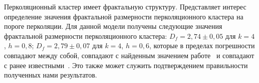 


%










Перколяционный кластер имеет фрактальную структуру. Представляет интерес определение значения фрактальной размерности перколяционного кластера на пороге перколяции. Для данной модели получены следующие значения фрактальной размерности перколяционного кластера: $D_{f}=2,74 \pm 0,05$ для $k=4$, $h=0,8$; $D_{f}=2,79 \pm 0,07$ для $k=4$, $h=0,6$, которые в пределах погрешности совпадают между собой, совпадают с найденным значением  работе~\cite{Lebovka} и  совпадают с ранее известными~\cite{Stauffer}. Это также может служить подтверждением правильности полученных нами результатов.














